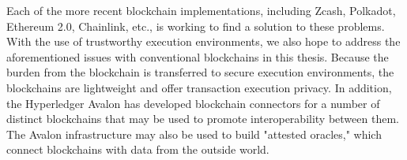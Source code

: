 \vspace{.5cm}

Each of the more recent blockchain implementations, including Zcash, Polkadot, Ethereum 2.0, Chainlink, etc., is working to find a solution to these problems. With the use of trustworthy execution environments, we also hope to address the aforementioned issues with conventional blockchains in this thesis. Because the burden from the blockchain is transferred to secure execution environments, the blockchains are lightweight and offer transaction execution privacy. In addition, the Hyperledger Avalon has developed blockchain connectors for a number of distinct blockchains that may be used to promote interoperability between them. The Avalon infrastructure may also be used to build "attested oracles," which connect blockchains with data from the outside world.

